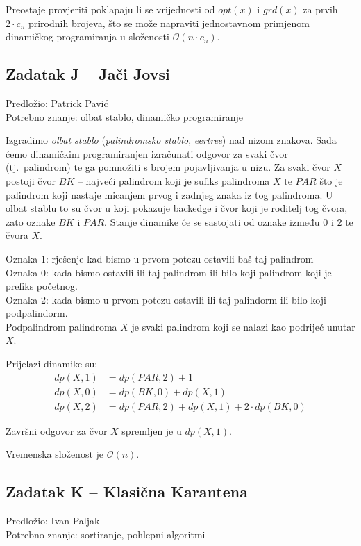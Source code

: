 \documentclass[a4paper]{article}
\begin{document}
Preostaje provjeriti poklapaju li se vrijednosti od $opt(x)$ i $grd(x)$ za
prvih $2 \cdot c_n$ prirodnih brojeva, što se može napraviti jednostavnom
primjenom dinamičkog programiranja u složenosti $\mathcal{O}(n \cdot c_n)$.

\clearpage

\subsection*{Zadatak J -- Jači Jovsi}
\textsf{Predložio: Patrick Pavić}\\
\textsf{Potrebno znanje: olbat stablo, dinamičko programiranje}

Izgradimo \textit{olbat stablo} (\textit{palindromsko stablo}, \textit{eertree})
nad nizom znakova. Sada ćemo dinamičkim programiranjen izračunati odgovor za
svaki čvor (tj.\ palindrom) te ga pomnožiti s brojem pojavljivanja u nizu.
Za svaki čvor $X$ postoji čvor $BK$ -- najveći palindrom koji je sufiks
palindroma $X$ te $PAR$ što je palindrom koji nastaje micanjem prvog i zadnjeg
znaka iz tog palindroma. U olbat stablu to su čvor u koji pokazuje backedge i
čvor koji je roditelj tog čvora, zato oznake $BK$ i $PAR$. Stanje dinamike će
se sastojati od oznake između $0$ i $2$ te čvora $X$.

Oznaka $1$: rješenje kad bismo u prvom potezu ostavili baš taj palindrom\\
Oznaka $0$: kada bismo ostavili ili taj palindrom ili bilo koji palindrom koji je prefiks početnog.\\
Oznaka $2$: kada bismo u prvom potezu ostavili ili taj palindorm ili bilo koji podpalindorm.\\

Podpalindrom palindroma $X$ je svaki palindrom koji se nalazi kao podriječ unutar $X$.

Prijelazi dinamike su:
\begin{align*}
  dp(X, 1) &= dp(PAR, 2) + 1 \\
  dp(X, 0) &= dp(BK, 0) + dp(X, 1) \\
  dp(X, 2) &= dp(PAR, 2) + dp(X, 1) + 2 \cdot dp(BK, 0)
\end{align*}

Završni odgovor za čvor $X$ spremljen je u $dp(X,1)$.

Vremenska složenost je $\mathcal{O}(n)$.

\subsection*{Zadatak K -- Klasična Karantena}
\textsf{Predložio: Ivan Paljak}\\
\textsf{Potrebno znanje: sortiranje, pohlepni algoritmi}
\end{document}
